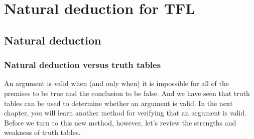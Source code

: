 \graphicspath{{figures--proofs/}}
\part{Natural deduction for TFL}
\label{ch.NDTFL}

\chapter{Natural deduction}\label{s:NDVeryIdea}

\section{Natural deduction versus truth tables}

An argument is valid when (and only when) it is impossible for all of the premises to be true and the conclusion to be false. And we have seen that truth tables can be used to determine whether an argument is valid. In the next chapter, you will learn another method for verifying that an argument is valid. Before we turn to this new method, however, let’s review the strengths and weakness of truth tables.

